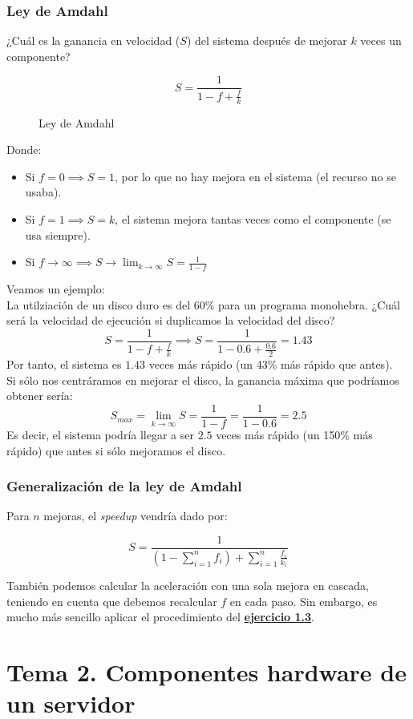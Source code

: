 \documentclass[12pt,spanish]{article}
\begin{document}
\subsubsection{Ley de Amdahl}
¿Cuál es la ganancia en velocidad ($S$) del sistema después de mejorar $k$ veces un componente?
\begin{figure}[H]
	\begin{equation*}
		S=\frac{1}{1-f+\frac{f}{k}}
	\end{equation*}
	\caption{Ley de Amdahl}
\end{figure}
Donde:
\begin{itemize}
	\item Si $f=0 \implies S=1$, por lo que no hay mejora en el sistema (el recurso no se usaba).
	\item Si $f=1 \implies S=k$, el sistema mejora tantas veces como el componente (se usa siempre).
	\item Si $f\to \infty \implies S \to \lim_{k \to \infty} S=\frac{1}{1-f}$
\end{itemize}

Veamos un ejemplo:\\
La utilziación de un disco duro es del 60\% para un programa monohebra. ¿Cuál será la velocidad de ejecución si duplicamos la velocidad del disco?
\[
S=\frac{1}{1-f+\frac{f}{k}} \implies S=\frac{1}{1-0.6+\frac{0.6}{2}}=1.43
\]
Por tanto, el sistema es $1.43$ veces más rápido (un 43\% más rápido que antes).\\
Si sólo nos centráramos en mejorar el disco, la ganancia máxima que podríamos obtener sería:
\[
S_{max}=\lim_{k \to \infty}S=\frac{1}{1-f}=\frac{1}{1-0.6}=2.5
\]
Es decir, el sistema podría llegar a ser $2.5$ veces más rápido (un 150\% más rápido) que antes si sólo mejoramos el disco.

\subsubsection{Generalización de la ley de Amdahl}

Para $n$ mejoras, el \textit{speedup} vendría dado por:

\[
S=\frac{1}{(1-\sum_{i=1}^{n}f_i) + \sum_{i=1}^{n}\frac{f_i}{k_i}}
\]

También podemos calcular la aceleración con una sola mejora en cascada, teniendo en cuenta que debemos recalcular $f$ en cada paso. Sin embargo, es mucho más sencillo aplicar el procedimiento del \hyperref[1.13]{\textbf{ejercicio 1.3}}.
\newpage
\section{Tema 2. Componentes hardware de un servidor}
\end{document}
